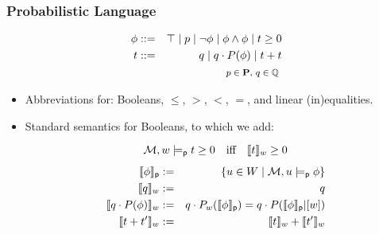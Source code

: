 \begin{frame}
  \frametitle{Probabilistic Language}
  \begin{eqnarray*}
    \phi & ::= & 
    \top \mid p \mid \neg\phi \mid \phi\land\phi \mid
    t\geq 0
    \\
    t   & ::= & q \mid q \cdot P(\phi) \mid t+t
    \\
    &&
    \text{\footnotesize 
      $p\in{\bf P}$,
      $q\in\mathbb{Q}$
    }
  \end{eqnarray*}
  \begin{itemize}
  \item Abbreviations for: Booleans, $\leq$, $>$, $<$, $=$, and linear
    (in)equalities.

  \item Standard semantics for Booleans, to which we add:
 \[
  \renewcommand{\arraystretch}{1.3}
  \begin{array}{lcl}
    \M,w\modelsp t\geq 0 & \text{iff} &
    \sem{t}_w\geq 0
  \end{array}
  \]
  \vspace{-2.3em}
  \begin{eqnarray*}
    \llbracket{\phi}\rrbracket_{\mathsf{p}} & := &
    \{ u \in W\mid {\cal M},u\models_{\mathsf{p}}\phi \}
    \\
    \llbracket{q}\rrbracket_w & := & q
    \\
    \llbracket{q\cdot P(\phi)}\rrbracket_w & := & 
    q\cdot P_{w}(\llbracket{\phi}\rrbracket_{\mathsf{p}}) =
    q\cdot P(\llbracket{\phi}\rrbracket_{\mathsf{p}}|[w])
    \\
    \llbracket{t+t'}\rrbracket_w & := &
    \llbracket{t}\rrbracket_w + \llbracket{t'}\rrbracket_w
  \end{eqnarray*}
  \end{itemize}
\end{frame}

